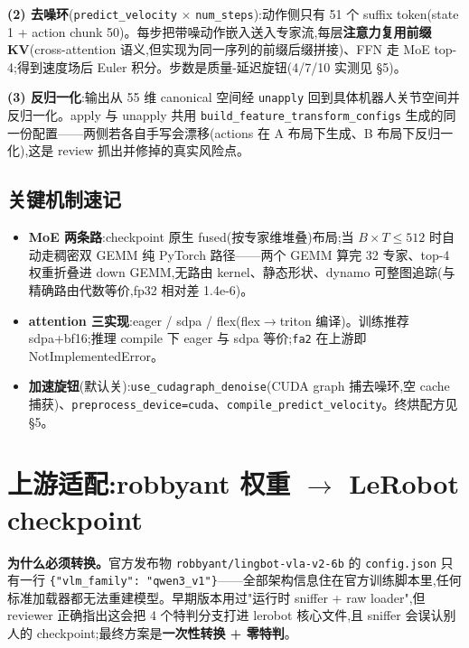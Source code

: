 \documentclass[11pt]{ctexart}
\begin{document}
\textbf{(2) 去噪环}(\texttt{predict\_velocity} $\times$ \texttt{num\_steps}):动作侧只有 51 个 suffix token(state 1 + action chunk 50)。每步把带噪动作嵌入送入专家流,每层\textbf{注意力复用前缀 KV}(cross-attention 语义,但实现为同一序列的前缀后缀拼接)、FFN 走 MoE top-4;得到速度场后 Euler 积分。步数是质量-延迟旋钮(4/7/10 实测见 §5)。

\textbf{(3) 反归一化}:输出从 55 维 canonical 空间经 \texttt{unapply} 回到具体机器人关节空间并反归一化。apply 与 unapply 共用 \texttt{build\_feature\_transform\_configs} 生成的同一份配置——两侧若各自手写会漂移(actions 在 A 布局下生成、B 布局下反归一化),这是 review 抓出并修掉的真实风险点。

\subsection{关键机制速记}

\begin{itemize}[nosep,leftmargin=1.4em]
  \item \textbf{MoE 两条路}:checkpoint 原生 fused(按专家维堆叠)布局;当 $B{\times}T \le 512$ 时自动走稠密双 GEMM 纯 PyTorch 路径——两个 GEMM 算完 32 专家、top-4 权重折叠进 down GEMM,无路由 kernel、静态形状、dynamo 可整图追踪(与精确路由代数等价,fp32 相对差 1.4e-6)。
  \item \textbf{attention 三实现}:eager / sdpa / flex(flex$\to$triton 编译)。训练推荐 sdpa+bf16;推理 compile 下 eager 与 sdpa 等价;\texttt{fa2} 在上游即 NotImplementedError。
  \item \textbf{加速旋钮}(默认关):\texttt{use\_cudagraph\_denoise}(CUDA graph 捕去噪环,空 cache 捕获)、\texttt{preprocess\_device=cuda}、\texttt{compile\_predict\_velocity}。终烘配方见 §5。
\end{itemize}

\section{上游适配:robbyant 权重 $\to$ LeRobot checkpoint}

\textbf{为什么必须转换。}官方发布物 \texttt{robbyant/lingbot-vla-v2-6b} 的 \texttt{config.json} 只有一行 \texttt{\{"vlm\_family": "qwen3\_v1"\}}——全部架构信息住在官方训练脚本里,任何标准加载器都无法重建模型。早期版本用过"运行时 sniffer + raw loader",但 reviewer 正确指出这会把 4 个特判分支打进 lerobot 核心文件,且 sniffer 会误认别人的 checkpoint;最终方案是\textbf{一次性转换 + 零特判}。
\end{document}
